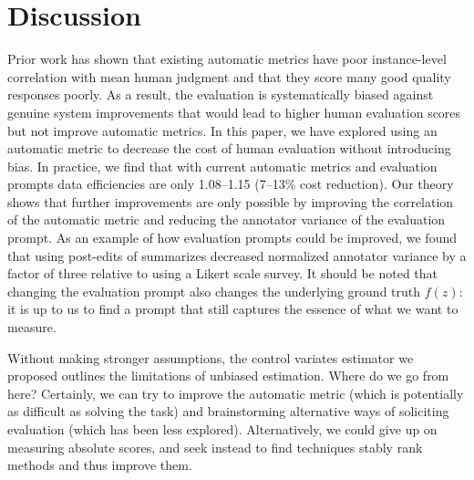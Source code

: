 \section{Discussion}
\label{sec:discussion}

Prior work has shown that existing automatic metrics have poor instance-level correlation with mean human judgment and that they score many good quality responses poorly.
As a result, the evaluation is systematically biased against genuine system improvements that would lead to higher human evaluation scores but not improve automatic metrics.
In this paper, we have explored using an automatic metric to decrease the cost of human evaluation without introducing bias.
In practice, we find that with current automatic metrics and evaluation prompts data efficiencies are only 1.08--1.15 (7--13\% cost reduction).
Our theory shows that further improvements are only possible by improving the correlation of the automatic metric and reducing the annotator variance of the evaluation prompt.
As an example of how evaluation prompts could be improved, we found that using post-edits of summarizes decreased normalized annotator variance by a factor of three relative to using a Likert scale survey.
It should be noted that changing the evaluation prompt also changes the underlying ground truth $f(z)$: it is up to us to find a prompt that still captures the essence of what we want to measure.


Without making stronger assumptions, the control variates estimator we proposed outlines the limitations of unbiased estimation.
Where do we go from here?
Certainly, we can try to improve the automatic metric (which is potentially as difficult as solving the task) and brainstorming alternative ways of soliciting evaluation (which has been less explored).
Alternatively, we could give up on measuring absolute scores, and seek instead to find techniques stably rank methods and thus improve them.

